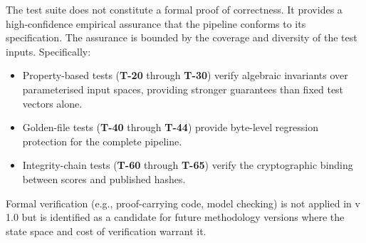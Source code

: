 The test suite does not constitute a formal proof of correctness.  It
provides a high-confidence empirical assurance that the pipeline conforms
to its specification.  The assurance is bounded by the coverage and
diversity of the test inputs.  Specifically:

\begin{itemize}
  \item Property-based tests (\textbf{T-20} through \textbf{T-30}) verify
    algebraic invariants over parameterised input spaces, providing stronger
    guarantees than fixed test vectors alone.
  \item Golden-file tests (\textbf{T-40} through \textbf{T-44}) provide
    byte-level regression protection for the complete pipeline.
  \item Integrity-chain tests (\textbf{T-60} through \textbf{T-65}) verify
    the cryptographic binding between scores and published hashes.
\end{itemize}

Formal verification (e.g., proof-carrying code, model checking) is not
applied in v\,1.0 but is identified as a candidate for future methodology
versions where the state space and cost of verification warrant it.
